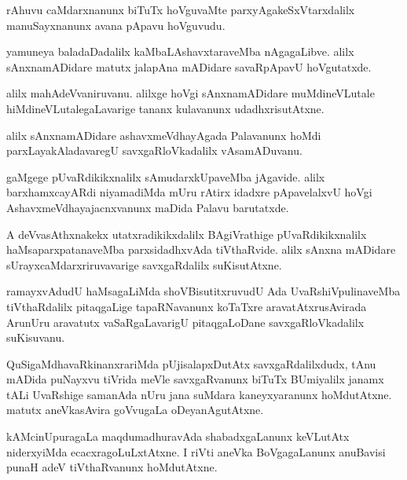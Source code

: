 \documentclass{article}
\begin{document}
\begin{mn}
rAhuvu caMdarxnanunx biTuTx hoVguvaMte parxyAgakeSxVtarxdalilx manuSayxnanunx avana pApavu 
hoVguvudu.
\end{mn}

\begin{mn}
yamuneya baladaDadalilx kaMbaLAshavxtaraveMba nAgagaLibve. alilx sAnxnamADidare matutx jalapAna 
mADidare savaRpApavU hoVgutatxde.
\end{mn}

\begin{mn}
alilx mahAdeVvaniruvanu. alilxge hoVgi sAnxnamADidare muMdineVLutale hiMdineVLutalegaLavarige 
tananx kulavanunx udadhxrisutAtxne.
\end{mn}

\begin{mn}
alilx sAnxnamADidare ashavxmeVdhayAgada Palavanunx hoMdi parxLayakAladavaregU savxgaRloVkadalilx 
vAsamADuvanu.
\end{mn}

\begin{mn}
gaMgege pUvaRdikikxnalilx sAmudarxkUpaveMba jAgavide. alilx barxhamxcayARdi niyamadiMda mUru rAtirx
idadxre pApavelalxvU hoVgi AshavxmeVdhayajacnxvanunx maDida Palavu barutatxde.
\end{mn}

\begin{mn}
A deVvasAthxnakekx utatxradikikxdalilx BAgiVrathige pUvaRdikikxnalilx haMsaparxpatanaveMba 
parxsidadhxvAda tiVthaRvide. alilx sAnxna mADidare sUrayxcaMdarxriruvavarige savxgaRdalilx 
suKisutAtxne.
\end{mn}

\begin{mn}
ramayxvAdudU haMsagaLiMda shoVBisutitxruvudU Ada UvaRshiVpulinaveMba tiVthaRdalilx pitaqgaLige 
tapaRNavanunx  koTaTxre aravatAtxrusAvirada ArunUru aravatutx vaSaRgaLavarigU pitaqgaLoDane 
savxgaRloVkadalilx suKisuvanu.
\end{mn}

\begin{mn}
QuSigaMdhavaRkinanxrariMda pUjisalapxDutAtx savxgaRdalilxdudx, tAnu mADida puNayxvu tiVrida 
meVle savxgaRvanunx biTuTx BUmiyalilx janamx tALi UvaRshige samanAda nUru jana suMdara 
kaneyxyaranunx hoMdutAtxne. matutx aneVkasAvira goVvugaLa oDeyanAgutAtxne.
\end{mn}

\begin{mn}
kAMcinUpuragaLa maqdumadhuravAda shabadxgaLanunx keVLutAtx niderxyiMda ecacxragoLuLxtAtxne. I 
riVti aneVka BoVgagaLanunx anuBavisi punaH adeV tiVthaRvanunx hoMdutAtxne.
\end{mn}
\end{document}
